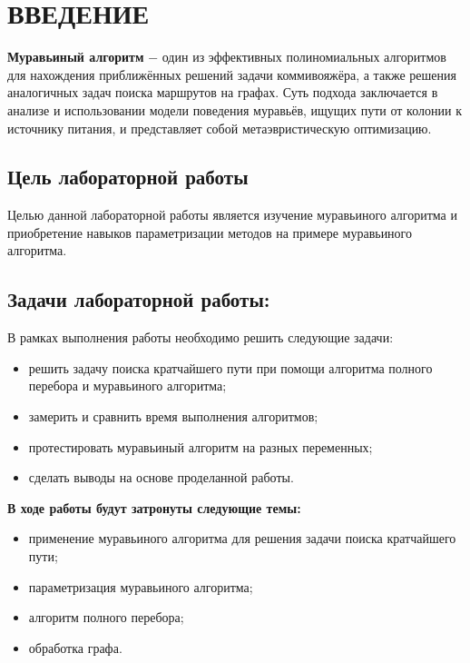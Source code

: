\chapter*{ВВЕДЕНИЕ}

\textbf{Муравьиный алгоритм} $-$ один из эффективных полиномиальных алгоритмов для нахождения приближённых решений задачи коммивояжёра, а также решения аналогичных задач поиска маршрутов на графах. 
Суть подхода заключается в анализе и использовании модели поведения муравьёв, ищущих пути от колонии к источнику питания, и представляет собой метаэвристическую оптимизацию.
\clearpage
\section*{Цель лабораторной работы}
Целью данной лабораторной работы является изучение муравьиного алгоритма и приобретение навыков параметризации методов на примере муравьиного алгоритма.

\section*{Задачи лабораторной работы:}
В рамках выполнения работы необходимо решить следующие задачи:
	
\begin{itemize}
	\item решить задачу поиска кратчайшего пути при помощи алгоритма полного перебора и муравьиного алгоритма;
	\item замерить и сравнить время выполнения алгоритмов;
	\item протестировать муравьиный алгоритм на разных переменных;
	\item сделать выводы на основе проделанной работы.
\end{itemize}

\textbf{В ходе работы будут затронуты следующие темы:}


\begin{itemize}
	\item применение муравьиного алгоритма для решения задачи поиска кратчайшего пути;
	\item параметризация муравьиного алгоритма;
	\item алгоритм полного перебора;
	\item обработка графа.
\end{itemize}

